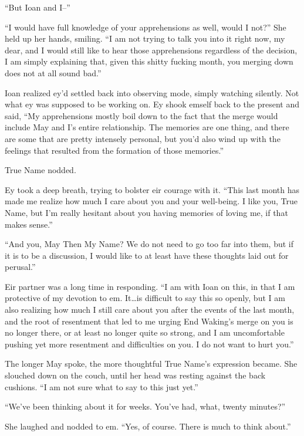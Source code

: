 ``But Ioan and I--''

``I would have full knowledge of your apprehensions as well, would I not?'' She held up her hands, smiling. ``I am not trying to talk you into it right now, my dear, and I would still like to hear those apprehensions regardless of the decision, I am simply explaining that, given this shitty fucking month, you merging down does not at all sound bad.''

Ioan realized ey'd settled back into observing mode, simply watching silently. Not what ey was supposed to be working on. Ey shook emself back to the present and said, ``My apprehensions mostly boil down to the fact that the merge would include May and I's entire relationship. The memories are one thing, and there are some that are pretty intensely personal, but you'd also wind up with the feelings that resulted from the formation of those memories.''

True Name nodded.

Ey took a deep breath, trying to bolster eir courage with it. ``This last month has made me realize how much I care about you and your well-being. I like you, True Name, but I'm really hesitant about you having memories of loving me, if that makes sense.''

``And you, May Then My Name? We do not need to go too far into them, but if it is to be a discussion, I would like to at least have these thoughts laid out for perusal.''

Eir partner was a long time in responding. ``I am with Ioan on this, in that I am protective of my devotion to em. It\ldots is difficult to say this so openly, but I am also realizing how much I still care about you after the events of the last month, and the root of resentment that led to me urging End Waking's merge on you is no longer there, or at least no longer quite so strong, and I am uncomfortable pushing yet more resentment and difficulties on you. I do not want to hurt you.''

The longer May spoke, the more thoughtful True Name's expression became. She slouched down on the couch, until her head was resting against the back cushions. ``I am not sure what to say to this just yet.''

``We've been thinking about it for weeks. You've had, what, twenty minutes?''

She laughed and nodded to em. ``Yes, of course. There is much to think about.''
